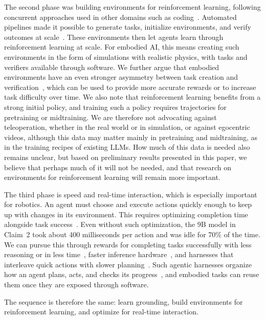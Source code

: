\documentclass{article}
\begin{document}
The second phase was building environments for reinforcement learning, following concurrent approaches used in other domains such as coding~\citep{pan2025swegym,yang2025swesmith}. Automated pipelines made it possible to generate tasks, initialize environments, and verify outcomes at scale~\citep{aggarwal2026gymanything,wang2026cuagym}. These environments then let agents learn through reinforcement learning at scale. For embodied AI, this means creating such environments in the form of simulations with realistic physics, with tasks and verifiers available through software. We further argue that embodied environments have an even stronger asymmetry between task creation and verification~\cite{aggarwal2026gymanythingrobotics}, which can be used to provide more accurate rewards or to increase task difficulty over time. We also note that reinforcement learning benefits from a strong initial policy, and training such a policy requires trajectories for pretraining or midtraining. We are therefore not advocating against teleoperation, whether in the real world or in simulation, or against egocentric videos, although this data may matter mainly in pretraining and midtraining, as in the training recipes of existing LLMs. How much of this data is needed also remains unclear, but based on preliminary results presented in this paper, we believe that perhaps much of it will not be needed, and that research on environments for reinforcement learning will remain more important.

The third phase is speed and real-time interaction, which is especially important for robotics. An agent must choose and execute actions quickly enough to keep up with changes in its environment. This requires optimizing completion time alongside task success~\citep{aggarwal2026cuaspeedrun}. Even without such optimization, the 9B model in Claim~2 took about 400 milliseconds per action and was idle for 70\% of the time. We can pursue this through rewards for completing tasks successfully with less reasoning or in less time~\citep{aggarwal2025l1,arora2025efficient}, faster inference hardware~\citep{lie2023cerebras,abts2020groq,he2025waferllm}, and harnesses that interleave quick actions with slower planning~\citep{shi2025hirobot,nvidia2025gr00t}. Such agentic harnesses organize how an agent plans, acts, and checks its progress~\citep{openai2026computeruse,koh2026macu}, and embodied tasks can reuse them once they are exposed through software.

The sequence is therefore the same: learn grounding, build environments for reinforcement learning, and optimize for real-time interaction.
\end{document}
